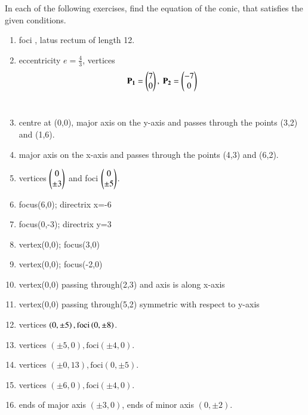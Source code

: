 In each of the following exercises, find the equation of the conic, that satisfies the given conditions.

\begin{enumerate}[label=\thesubsection.\arabic*,ref=\thesubsection.\theenumi,resume*]
\item  foci , latus rectum of length 12.
\\
\solution
		
    \item eccentricity $e = \frac{4}{3}$,
    vertices 
    \begin{align}
        \mathbf{P_1} = \begin{pmatrix}7\\0\end{pmatrix},\ \mathbf{P_2} = \begin{pmatrix}-7\\0\end{pmatrix}
        \label{eq:chapters/11/11/4/14/vert}
    \end{align}
\\
\solution
		
\item centre at (0,0), major axis on the y-axis and passes through the points (3,2) and (1,6).
\\
\solution
\item major axis on the x-axis and passes through the points (4,3) and (6,2).
\\
\solution
\item vertices $\begin{pmatrix}0\\\pm 3\end{pmatrix}$ and foci $\begin{pmatrix}0\\\pm5\end{pmatrix}$.
	\\
\solution
\item focus(6,0); directrix x=-6 
\item focus(0,-3); directrix y=3
\item vertex(0,0); focus(3,0)
\item vertex(0,0); focus(-2,0) 
\item vertex(0,0) passing through(2,3) and axis is along x-axis
\item vertex(0,0) passing through(5,2) symmetric with respect to y-axis
\item vertices $\left(0,\pm 5\right), \text{foci} \left(0,\pm 8\right)$.  
\item vertices $(\pm5,0),\text{foci} (\pm4,0)$.
\item vertices $(\pm0,13),\text{foci} (0,\pm5)$.
\item vertices $(\pm6,0),\text{foci} (\pm4,0)$.
\item ends of major axis $(\pm3,0)$, ends of minor axis $(0,\pm2)$.

\end{enumerate}
